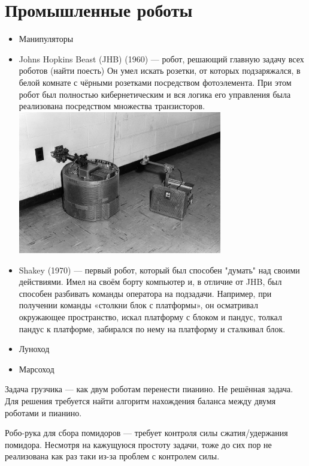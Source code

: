 \documentclass[12pt]{article}
\begin{document}
\begin{sloppypar}
    \section{Промышленные роботы}
    \begin{itemize}
        \item Манипуляторы
        \item Johns Hopkins Beast (JHB) (1960) — робот, решающий главную задачу всех
              роботов (найти поесть) Он умел искать розетки, от которых
              подзаряжался, в белой комнате с чёрными розетками посредством
              фотоэлемента. При этом робот был полностью кибернетическим и вся
              логика его управления была реализована посредством множества
              транзисторов.
              \includegraphics[width=0.7\textwidth]{graphics/johns_beast.jpg}
        \item Shakey (1970) — первый робот, который был способен "думать" над своими действиями.
              Имел на своём борту компьютер и, в отличие от JHB, был способен
              разбивать команды оператора на подзадачи. Например, при
              получении команды «столкни блок с платформы», он осматривал
              окружающее пространство, искал платформу с блоком и пандус, толкал
              пандус к платформе, забирался по нему на платформу и сталкивал
              блок.
        \item Луноход
        \item Марсоход
    \end{itemize}

    Задача грузчика — как двум роботам перенести пианино. Не решённая задача.
    Для решения требуется найти алгоритм нахождения баланса между двумя роботами
    и пианино.

    Робо-рука для сбора помидоров — требует контроля силы сжатия/удержания
    помидора. Несмотря на кажущуюся простоту задачи, тоже до сих пор не
    реализована как раз таки из-за проблем с контролем силы.


\end{sloppypar}
\end{document}
